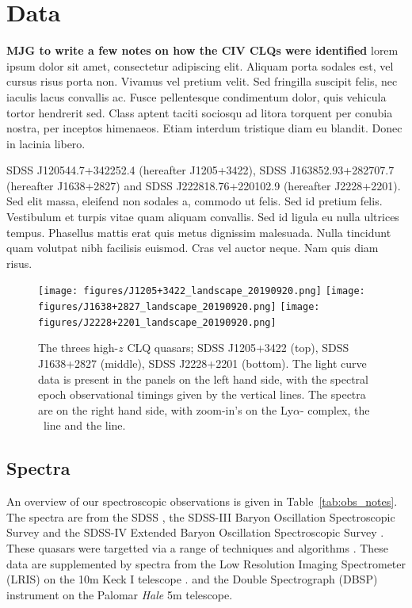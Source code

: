 \documentclass[a4paper,fleqn,usenatbib]{mnras}
\begin{document}
\section{Data}
{\bf MJG to write a few notes on how the CIV CLQs were identified} 
lorem ipsum dolor sit amet, consectetur adipiscing elit. Aliquam
porta sodales est, vel cursus risus porta non. Vivamus vel pretium
velit. Sed fringilla suscipit felis, nec iaculis lacus convallis
ac. Fusce pellentesque condimentum dolor, quis vehicula tortor
hendrerit sed. Class aptent taciti sociosqu ad litora torquent per
conubia nostra, per inceptos himenaeos. Etiam interdum tristique diam
eu blandit. Donec in lacinia libero.

SDSS J120544.7+342252.4  (hereafter J1205+3422), 
SDSS J163852.93+282707.7 (hereafter J1638+2827) and
SDSS J222818.76+220102.9 (hereafter J2228+2201). 
Sed elit massa, eleifend non sodales a, commodo ut felis. Sed id
pretium felis. Vestibulum et turpis vitae quam aliquam convallis. Sed
id ligula eu nulla ultrices tempus. Phasellus mattis erat quis metus
dignissim malesuada. Nulla tincidunt quam volutpat nibh facilisis
euismod. Cras vel auctor neque. Nam quis diam risus.




\begin{figure}
  \centering
  \texttt{[image: figures/J1205+3422\_landscape\_20190920.png]}
  \texttt{[image: figures/J1638+2827\_landscape\_20190920.png]}
  \texttt{[image: figures/J2228+2201\_landscape\_20190920.png]}
  \vspace{-12pt}
  \caption[]{The threes high-$z$ CLQ quasars; 
    SDSS J1205+3422 (top), 
    SDSS J1638+2827 (middle), 
    SDSS J2228+2201 (bottom). 
The light curve data is present in the panels on the left hand side, with the 
spectral epoch observational timings given by the vertical lines. 
The spectra are on the right hand side, with zoom-in's on the Ly$\alpha$-\nv 
complex, the \civ\ line and the \mgii line. 
  }
  \label{fig:civ_clqs}
\end{figure}
\subsection{Spectra}
An overview of our spectroscopic observations is given in
Table~\ref{tab:obs_notes}.  The spectra are from the SDSS
\citep{Stoughton2002, DR7, Schneider2010}, the SDSS-III Baryon
Oscillation Spectroscopic Survey \citep[BOSS][]{Eisenstein2011,
Dawson2013, Smee2013, Alam2015, Paris2017} and the SDSS-IV Extended
Baryon Oscillation Spectroscopic Survey \citep[eBOSS; ][]{Dawson2016,
Abolfathi2018, Paris2018}.  These quasars were targetted via a range of
techniques and algorithms \citep[][]{Richards2002, Ross2012,
Myers2015}.  These data are supplemented by spectra from the Low
Resolution Imaging Spectrometer (LRIS) on the 10m Keck {\sc I}
telescope \citep{Oke1995}.  and the Double Spectrograph (DBSP)
instrument on the Palomar {\it Hale} 5m telescope.
\end{document}
